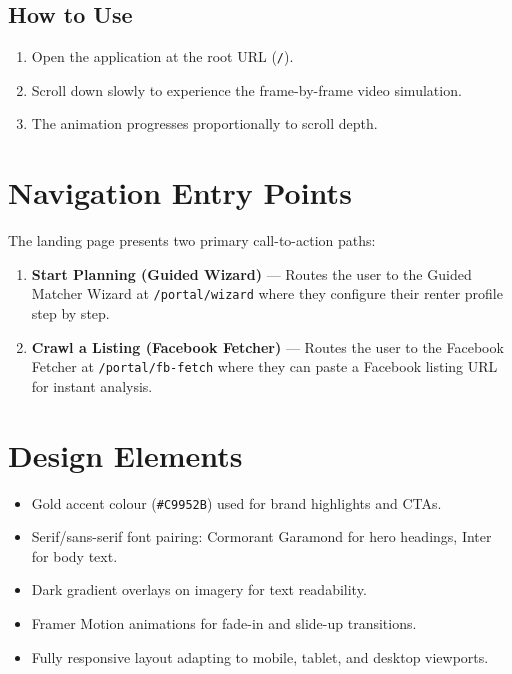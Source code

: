 \documentclass[12pt, a4paper, oneside]{report}
\begin{document}
\subsection{How to Use}

\begin{enumerate}[leftmargin=2em]
  \item Open the application at the root URL (\texttt{/}).
  \item Scroll down slowly to experience the frame-by-frame video simulation.
  \item The animation progresses proportionally to scroll depth.
\end{enumerate}

\section{Navigation Entry Points}

The landing page presents two primary call-to-action paths:

\begin{enumerate}[leftmargin=2em]
  \item \textbf{Start Planning (Guided Wizard)} --- Routes the user to the Guided Matcher Wizard at \texttt{/portal/wizard} where they configure their renter profile step by step.
  \item \textbf{Crawl a Listing (Facebook Fetcher)} --- Routes the user to the Facebook Fetcher at \texttt{/portal/fb-fetch} where they can paste a Facebook listing URL for instant analysis.
\end{enumerate}

\section{Design Elements}

\begin{itemize}[leftmargin=2em]
  \item Gold accent colour (\texttt{\#C9952B}) used for brand highlights and CTAs.
  \item Serif/sans-serif font pairing: Cormorant Garamond for hero headings, Inter for body text.
  \item Dark gradient overlays on imagery for text readability.
  \item Framer Motion animations for fade-in and slide-up transitions.
  \item Fully responsive layout adapting to mobile, tablet, and desktop viewports.
\end{itemize}
\end{document}
